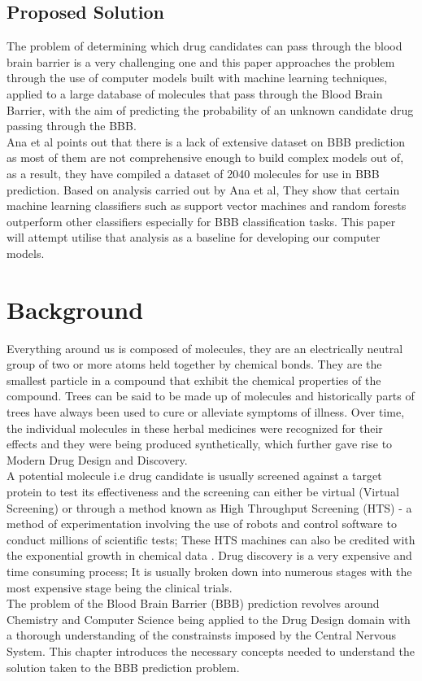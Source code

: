 \documentclass[a4paper,12pt]{report}
\begin{document}
	\section{Proposed Solution}
		The problem of determining which drug candidates can pass through the blood brain barrier is a very challenging one and this paper approaches the problem through the use of computer models built with machine learning techniques, applied to a large database of molecules that pass through the Blood Brain Barrier, with the aim of predicting the probability of an unknown candidate drug passing through the BBB. \\
		Ana et al \cite{Anaetal2012} points out that there is a lack of extensive dataset on BBB prediction as most of them are not comprehensive enough to build complex models out of, as a result, they have compiled a dataset of 2040 molecules for use in BBB prediction. Based on analysis carried out \cite{Anaetal2012} by Ana et al, They show that certain machine learning classifiers such as support vector machines and random forests outperform other classifiers especially for BBB classification tasks. This paper will attempt utilise that analysis as a baseline for developing our computer models.


\chapter{Background}
	Everything around us is composed of molecules, they are an electrically neutral group of two or more atoms held together by chemical bonds. They are the smallest particle in a compound that exhibit the chemical properties of the compound. 
	Trees can be said to be made up of molecules and historically parts of trees have always been used to cure or alleviate symptoms of illness. Over time, the individual molecules in these herbal medicines were recognized for their effects and they were being produced synthetically, which further gave rise to Modern Drug Design and Discovery. \\
	A potential molecule i.e drug candidate is usually screened against a target protein to test its effectiveness and the screening can either be virtual (Virtual Screening) or through a method known as High Throughput Screening (HTS) - a method of experimentation involving the use of robots and control software to conduct millions of scientific tests; These HTS machines can also be credited with the exponential growth in chemical data \cite{Dougetal2008}.
	Drug discovery is a very expensive and time consuming process; It is usually broken down into numerous stages with the most expensive stage being the clinical trials. \\
	The problem of the Blood Brain Barrier (BBB) prediction revolves around Chemistry and Computer Science being applied to the Drug Design domain with a thorough understanding of the constrainsts imposed by the Central Nervous System. This chapter introduces the necessary concepts needed to understand the solution taken to the BBB prediction problem.
	
\end{document}
